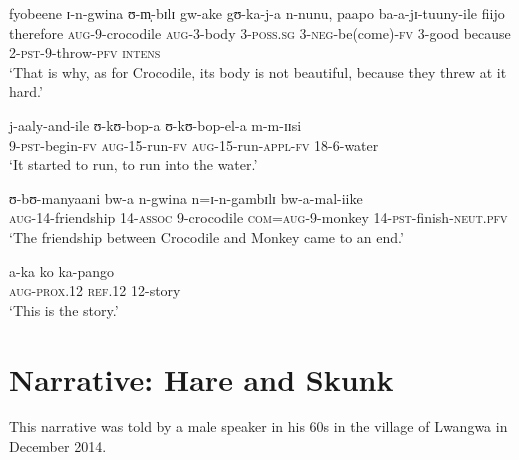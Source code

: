 \begin{exe}
\ex \gll fyobeene ɪ-n-gwina ʊ-m̩-bɪlɪ gw-ake gʊ-ka-j-a n-nunu, paapo ba-a-jɪ-tuuny-ile fiijo\\
therefore \textsc{aug}-9-crocodile \textsc{aug}-3-body 3-\textsc{poss.sg} 3-\textsc{neg}-be(come)-\textsc{fv} 3-good because 2-\textsc{pst}-9-throw-\textsc{pfv} \textsc{intens}\\
\glt \lq That is why, as for Crocodile, its body is not beautiful, because they threw at it hard.'

\ex \gll j-aaly-and-ile ʊ-kʊ-bop-a ʊ-kʊ-bop-el-a m-m-ɪɪsi\\
9-\textsc{pst}-begin-\textsc{fv} \textsc{aug}-15-run-\textsc{fv} \textsc{aug}-15-run-\textsc{appl}-\textsc{fv} 18-6-water\\
\glt \lq It started to run, to run into the water.'

\ex \gll ʊ-bʊ-manyaani bw-a n-gwina n=ɪ-n-gambɪlɪ bw-a-mal-iike\\
\textsc{aug}-14-friendship 14-\textsc{assoc} 9-crocodile \textsc{com}=\textsc{aug}-9-monkey 14-\textsc{pst}-finish-\textsc{neut.pfv}\\
\glt \lq The friendship between Crocodile and Monkey came to an end.'

\ex \gll a-ka ko ka-pango\\
\textsc{aug}-\textsc{prox.12} \textsc{ref.12} 12-story\\
\glt \lq This is the story.'

\end{exe}




\section{Narrative: Hare and Skunk}
\label{AppendixHareSkunk}
This narrative was told by a male speaker in his 60s in the village of Lwangwa in December 2014.

\setcounter{equation}{0}

